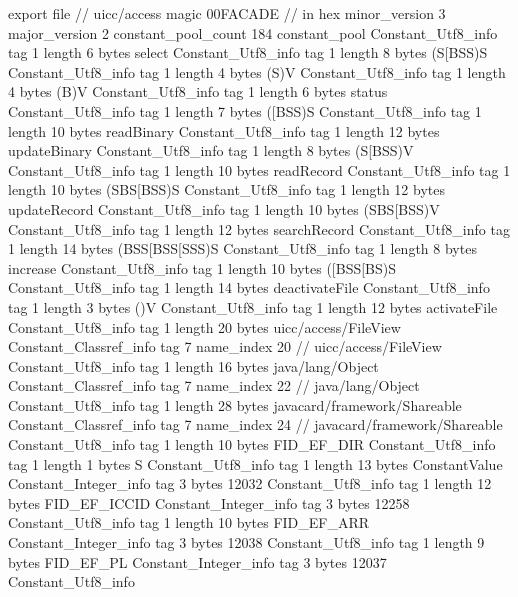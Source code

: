 export file {		// uicc/access
	magic	00FACADE		 // in hex
	minor_version	3
	major_version	2
	constant_pool_count	184
	constant_pool {
		Constant_Utf8_info {
			tag	1
			length	6
			bytes	select
		}
		Constant_Utf8_info {
			tag	1
			length	8
			bytes	(S[BSS)S
		}
		Constant_Utf8_info {
			tag	1
			length	4
			bytes	(S)V
		}
		Constant_Utf8_info {
			tag	1
			length	4
			bytes	(B)V
		}
		Constant_Utf8_info {
			tag	1
			length	6
			bytes	status
		}
		Constant_Utf8_info {
			tag	1
			length	7
			bytes	([BSS)S
		}
		Constant_Utf8_info {
			tag	1
			length	10
			bytes	readBinary
		}
		Constant_Utf8_info {
			tag	1
			length	12
			bytes	updateBinary
		}
		Constant_Utf8_info {
			tag	1
			length	8
			bytes	(S[BSS)V
		}
		Constant_Utf8_info {
			tag	1
			length	10
			bytes	readRecord
		}
		Constant_Utf8_info {
			tag	1
			length	10
			bytes	(SBS[BSS)S
		}
		Constant_Utf8_info {
			tag	1
			length	12
			bytes	updateRecord
		}
		Constant_Utf8_info {
			tag	1
			length	10
			bytes	(SBS[BSS)V
		}
		Constant_Utf8_info {
			tag	1
			length	12
			bytes	searchRecord
		}
		Constant_Utf8_info {
			tag	1
			length	14
			bytes	(BSS[BSS[SSS)S
		}
		Constant_Utf8_info {
			tag	1
			length	8
			bytes	increase
		}
		Constant_Utf8_info {
			tag	1
			length	10
			bytes	([BSS[BS)S
		}
		Constant_Utf8_info {
			tag	1
			length	14
			bytes	deactivateFile
		}
		Constant_Utf8_info {
			tag	1
			length	3
			bytes	()V
		}
		Constant_Utf8_info {
			tag	1
			length	12
			bytes	activateFile
		}
		Constant_Utf8_info {
			tag	1
			length	20
			bytes	uicc/access/FileView
		}
		Constant_Classref_info {
			tag	7
			name_index	20		// uicc/access/FileView
		}
		Constant_Utf8_info {
			tag	1
			length	16
			bytes	java/lang/Object
		}
		Constant_Classref_info {
			tag	7
			name_index	22		// java/lang/Object
		}
		Constant_Utf8_info {
			tag	1
			length	28
			bytes	javacard/framework/Shareable
		}
		Constant_Classref_info {
			tag	7
			name_index	24		// javacard/framework/Shareable
		}
		Constant_Utf8_info {
			tag	1
			length	10
			bytes	FID_EF_DIR
		}
		Constant_Utf8_info {
			tag	1
			length	1
			bytes	S
		}
		Constant_Utf8_info {
			tag	1
			length	13
			bytes	ConstantValue
		}
		Constant_Integer_info {
			tag	3
			bytes	12032
		}
		Constant_Utf8_info {
			tag	1
			length	12
			bytes	FID_EF_ICCID
		}
		Constant_Integer_info {
			tag	3
			bytes	12258
		}
		Constant_Utf8_info {
			tag	1
			length	10
			bytes	FID_EF_ARR
		}
		Constant_Integer_info {
			tag	3
			bytes	12038
		}
		Constant_Utf8_info {
			tag	1
			length	9
			bytes	FID_EF_PL
		}
		Constant_Integer_info {
			tag	3
			bytes	12037
		}
		Constant_Utf8_info {
}}}
